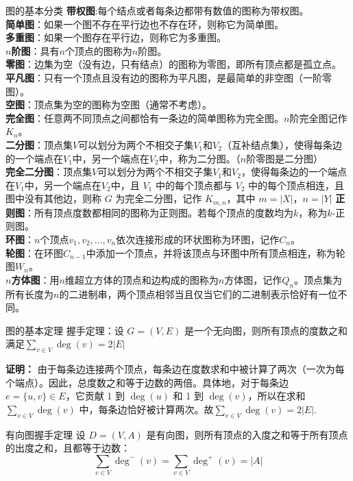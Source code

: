 \documentclass[lang=cn,11pt]{elegantbook}
\begin{document}
\begin{definition}{图的基本分类}
\textbf{带权图}:每个结点或者每条边都带有数值的图称为带权图。\\
\textbf{简单图}：如果一个图不存在平行边也不存在环，则称它为简单图。\\
\textbf{多重图}：如果一个图存在平行边，则称它为多重图。\\
\textbf{$n$阶图}：具有$n$个顶点的图称为$n$阶图。\\
\textbf{零图}：边集为空（没有边，只有结点）的图称为零图，即所有顶点都是孤立点。\\
\textbf{平凡图}：只有一个顶点且没有边的图称为平凡图，是最简单的非空图（一阶零图）。\\
\textbf{空图}：顶点集为空的图称为空图（通常不考虑）。\\
\textbf{完全图}：任意两不同顶点之间都恰有一条边的简单图称为完全图。$n$阶完全图记作$K_n$。\\
\textbf{二分图}：顶点集$V$可以划分为两个不相交子集$V_1$和$V_2$（互补结点集），使得每条边的一个端点在$V_1$中，另一个端点在$V_2$中，称为二分图。（$n$阶零图是二分图）\\
\textbf{完全二分图}：顶点集$V$可以划分为两个不相交子集$V_1$和$V_2$，使得每条边的一个端点在$V_1$中，另一个端点在$V_2$中，且 $V_1$ 中的每个顶点都与 $V_2$ 中的每个顶点相连，且图中没有其他边，则称 $G$ 为完全二分图，记作 $K_{m,n}$，其中 $m = |X|$，$n = |Y|$
\textbf{正则图}：所有顶点度数都相同的图称为正则图。若每个顶点的度数均为$k$，称为$k$-正则图。\\
\textbf{环图}：$n$个顶点$v_1,v_2,\ldots,v_n$依次连接形成的环状图称为环图，记作$C_n$。\\
\textbf{轮图}：在环图$C_{n-1}$中添加一个顶点，并将该顶点与环图中所有顶点相连，称为轮图$W_n$。\\
\textbf{$n$方体图}：用$n$维超立方体的顶点和边构成的图称为$n$方体图，记作$Q_n$。顶点集为所有长度为$n$的二进制串，两个顶点相邻当且仅当它们的二进制表示恰好有一位不同。
\end{definition}
\begin{theorem}{图的基本定理}
握手定理：设 $G = (V, E)$ 是一个无向图，则所有顶点的度数之和满足$\displaystyle\sum_{v \in V} \deg(v) = 2|E|$
\end{theorem}
\textbf{证明：} 由于每条边连接两个顶点，每条边在度数求和中被计算了两次（一次为每个端点）。因此，总度数之和等于边数的两倍。具体地，对于每条边 $e = \{u, v\} \in E$，它贡献 1 到 $\deg(u)$ 和 1 到 $\deg(v)$，所以在求和 $\sum_{v \in V} \deg(v)$ 中，每条边恰好被计算两次。故$\displaystyle\sum_{v \in V} \deg(v) = 2|E|$.
\begin{theorem}{有向图握手定理}
设 $D = (V, A)$ 是有向图，则所有顶点的入度之和等于所有顶点的出度之和，且都等于边数：
\[
\sum_{v \in V} \deg^-(v) = \sum_{v \in V} \deg^+(v) = |A|
\]
\end{theorem}
\end{document}
